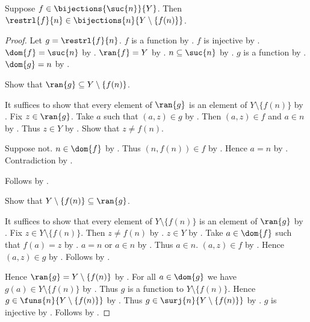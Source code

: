 \begin{proposition}\label{bijection_remove_successor}
    Suppose $f\in\bijections{\suc{n}}{Y}$.
    Then $\restrl{f}{n}\in\bijections{n}{Y\setminus\{f(n)\}}$.
\end{proposition}
\begin{proof}
    Let $g=\restrl{f}{n}$.
    $f$ is a function by .
    $f$ is injective by .
    $\dom{f}=\suc{n}$ by .
    $\ran{f}=Y$ by .
    $n\subseteq\suc{n}$ by .
    $g$ is a function by .
    $\dom{g}=n$ by .

    Show that $\ran{g}\subseteq Y\setminus\{f(n)\}$.
    \begin{subproof}
        It suffices to show that every element of $\ran{g}$ is an element
            of $Y\setminus\{f(n)\}$ by .
        Fix $z\in\ran{g}$.
        Take $a$ such that $(a,z)\in g$ by .
        Then $(a,z)\in f$ and $a\in n$ by .
        Thus $z\in Y$ by .
        Show that $z\neq f(n)$.
        \begin{subproof}
            Suppose not.
            $n\in\dom{f}$ by .
            Thus $(n,f(n))\in f$ by .
            Hence $a=n$ by .
            Contradiction by .
        \end{subproof}
        Follows by .
    \end{subproof}

    Show that $Y\setminus\{f(n)\}\subseteq\ran{g}$.
    \begin{subproof}
        It suffices to show that every element of $Y\setminus\{f(n)\}$ is
            an element of $\ran{g}$ by .
        Fix $z\in Y\setminus\{f(n)\}$.
        Then $z\neq f(n)$ by .
        $z\in Y$ by .
        Take $a\in\dom{f}$ such that $f(a)=z$ by .
        $a=n$ or $a\in n$ by .
        Thus $a\in n$.
        $(a,z)\in f$ by .
        Hence $(a,z)\in g$ by .
        Follows by .
    \end{subproof}
    Hence $\ran{g}=Y\setminus\{f(n)\}$ by .
    For all $a\in\dom{g}$ we have $g(a)\in Y\setminus\{f(n)\}$
        by .
    Thus $g$ is a function to $Y\setminus\{f(n)\}$.
    Hence $g\in\funs{n}{Y\setminus\{f(n)\}}$ by .
    Thus $g\in\surj{n}{Y\setminus\{f(n)\}}$ by .
    $g$ is injective by .
    Follows by .
\end{proof}

